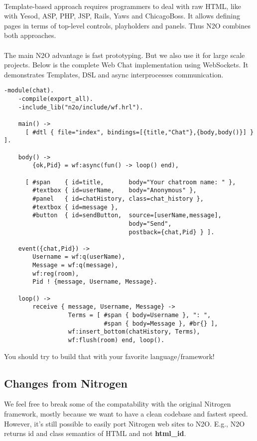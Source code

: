\paragraph{}
Template-based approach requires programmers to deal with raw HTML,
like with Yesod, ASP, PHP, JSP, Rails, Yaws and ChicagoBoss. It allows
defining pages in terms of top-level controls, playholders
and panels. Thus N2O combines both approaches.

\paragraph{}
The main N2O advantage is fast prototyping. But we also use it for large
scale projects. Below is the complete Web Chat implementation using
WebSockets. It demonstrates Templates, DSL and async
interprocesses communication.

\newpage
\begin{lstlisting}[caption=chat.erl]
    -module(chat).
    -compile(export_all).
    -include_lib("n2o/include/wf.hrl").

    main() -> 
      [ #dtl { file="index", bindings=[{title,"Chat"},{body,body()}] } ].

    body() ->
        {ok,Pid} = wf:async(fun() -> loop() end),

      [ #span    { id=title,       body="Your chatroom name: " }, 
        #textbox { id=userName,    body="Anonymous" },
        #panel   { id=chatHistory, class=chat_history },
        #textbox { id=message },
        #button  { id=sendButton,  source=[userName,message],
                                   body="Send", 
                                   postback={chat,Pid} } ].

    event({chat,Pid}) ->
        Username = wf:q(userName),
        Message = wf:q(message),
        wf:reg(room),
        Pid ! {message, Username, Message}.

    loop() ->
        receive { message, Username, Message} ->
                  Terms = [ #span { body=Username }, ": ",
                            #span { body=Message }, #br{} ],
                  wf:insert_bottom(chatHistory, Terms),
                  wf:flush(room) end, loop().
\end{lstlisting}

You should try to build that with your favorite language/framework!

\subsection*{Changes from Nitrogen}
We feel free to break some of the compatability with the original
Nitrogen framework, mostly because we want to have a clean codebase
and fastest speed. However, it's still possible to easily port
Nitrogen web sites to N2O. E.g., N2O returns id and class semantics
of HTML and not {\bf html\_id}.

